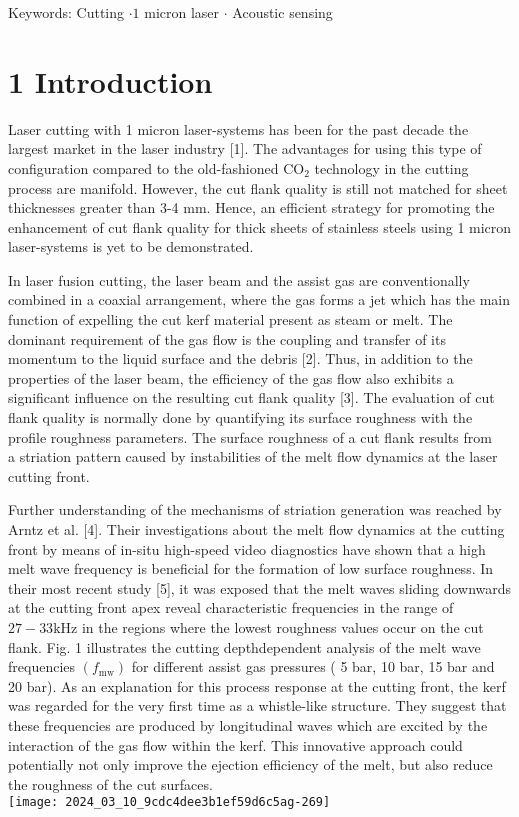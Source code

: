 \documentclass[10pt]{article}
\begin{document}
Keywords: Cutting $\cdot 1$ micron laser $\cdot$ Acoustic sensing

\section*{1 Introduction}
Laser cutting with 1 micron laser-systems has been for the past decade the largest market in the laser industry [1]. The advantages for using this type of configuration compared to the old-fashioned $\mathrm{CO}_{2}$ technology in the cutting process are manifold. However, the cut flank quality is still not matched for sheet thicknesses greater than 3-4 mm. Hence, an efficient strategy for promoting the enhancement of cut flank quality for thick sheets of stainless steels using 1 micron laser-systems is yet to be demonstrated.

In laser fusion cutting, the laser beam and the assist gas are conventionally combined in a coaxial arrangement, where the gas forms a jet which has the main function of expelling the cut kerf material present as steam or melt. The dominant requirement of the gas flow is the coupling and transfer of its momentum to the liquid surface and the debris [2]. Thus, in addition to the properties of the laser beam, the efficiency of the gas flow also exhibits a significant influence on the resulting cut flank quality [3]. The evaluation of cut flank quality is normally done by quantifying its surface roughness with the profile roughness parameters. The surface roughness of a cut flank results from\\
a striation pattern caused by instabilities of the melt flow dynamics at the laser cutting front.

Further understanding of the mechanisms of striation generation was reached by Arntz et al. [4]. Their investigations about the melt flow dynamics at the cutting front by means of in-situ high-speed video diagnostics have shown that a high melt wave frequency is beneficial for the formation of low surface roughness. In their most recent study [5], it was exposed that the melt waves sliding downwards at the cutting front apex reveal characteristic frequencies in the range of $27-33 \mathrm{kHz}$ in the regions where the lowest roughness values occur on the cut flank. Fig. 1 illustrates the cutting depthdependent analysis of the melt wave frequencies $\left(f_{\mathrm{mw}}\right)$ for different assist gas pressures ( 5 bar, 10 bar, 15 bar and 20 bar). As an explanation for this process response at the cutting front, the kerf was regarded for the very first time as a whistle-like structure. They suggest that these frequencies are produced by longitudinal waves which are excited by the interaction of the gas flow within the kerf. This innovative approach could potentially not only improve the ejection efficiency of the melt, but also reduce the roughness of the cut surfaces.\\
\texttt{[image: 2024\_03\_10\_9cdc4dee3b1ef59d6c5ag-269]}
\end{document}
